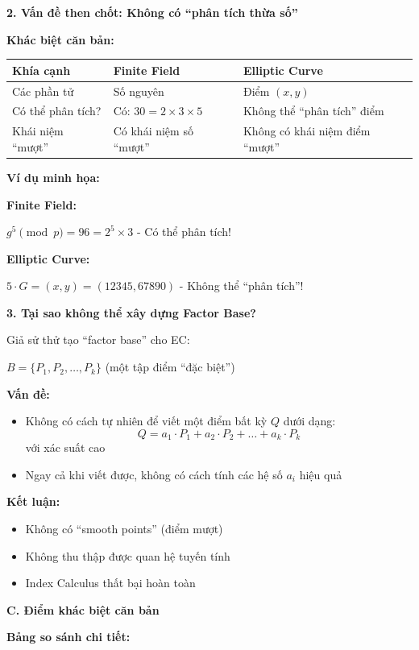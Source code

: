 \textbf{2. Vấn đề then chốt: Không có ``phân tích thừa số''}

\textbf{Khác biệt căn bản:}

\begin{center}
\begin{tabular}{|p{4cm}|p{4cm}|p{4cm}|}
\hline
\textbf{Khía cạnh} & \textbf{Finite Field} & \textbf{Elliptic Curve} \\
\hline
Các phần tử & Số nguyên & Điểm $(x,y)$ \\
Có thể phân tích? & Có: $30 = 2 \times 3 \times 5$ & Không thể ``phân tích'' điểm \\
Khái niệm ``mượt'' & Có khái niệm số ``mượt'' & Không có khái niệm điểm ``mượt'' \\
\hline
\end{tabular}
\end{center}

\textbf{Ví dụ minh họa:}

\textbf{Finite Field:}

$g^5 \pmod{p} = 96 = 2^5 \times 3$ - Có thể phân tích!

\textbf{Elliptic Curve:}

$5 \cdot G = (x, y) = (12345, 67890)$ - Không thể ``phân tích''!

\textbf{3. Tại sao không thể xây dựng Factor Base?}

Giả sử thử tạo ``factor base'' cho EC:

$B = \{P_1, P_2, \ldots, P_k\}$ (một tập điểm ``đặc biệt'')

\textbf{Vấn đề:}
\begin{itemize}
    \item Không có cách tự nhiên để viết một điểm bất kỳ $Q$ dưới dạng:
    \[
    Q = a_1 \cdot P_1 + a_2 \cdot P_2 + \ldots + a_k \cdot P_k
    \]
    với xác suất cao
    \item Ngay cả khi viết được, không có cách tính các hệ số $a_i$ hiệu quả
\end{itemize}

\textbf{Kết luận:}
\begin{itemize}
    \item Không có ``smooth points'' (điểm mượt)
    \item Không thu thập được quan hệ tuyến tính
    \item Index Calculus thất bại hoàn toàn
\end{itemize}

\textbf{C. Điểm khác biệt căn bản}

\textbf{Bảng so sánh chi tiết:}

